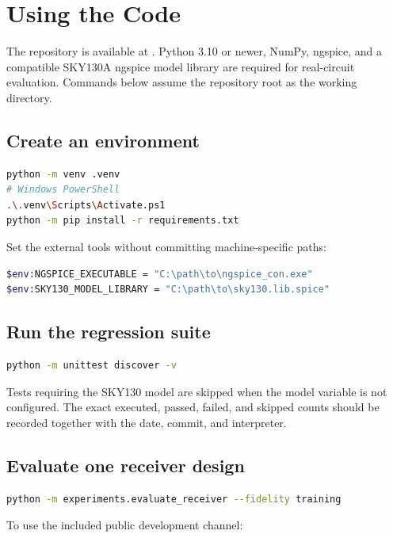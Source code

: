 \chapter{Using the Code}

The repository is available at \href{\projecturl}{\projecturl}. Python 3.10 or
newer, NumPy, ngspice, and a compatible SKY130A ngspice model library are
required for real-circuit evaluation. Commands below assume the repository root
as the working directory.

\section{Create an environment}

\begin{lstlisting}[language=bash]
python -m venv .venv
# Windows PowerShell
.\.venv\Scripts\Activate.ps1
python -m pip install -r requirements.txt
\end{lstlisting}

Set the external tools without committing machine-specific paths:

\begin{lstlisting}[language=bash]
$env:NGSPICE_EXECUTABLE = "C:\path\to\ngspice_con.exe"
$env:SKY130_MODEL_LIBRARY = "C:\path\to\sky130.lib.spice"
\end{lstlisting}

\section{Run the regression suite}

\begin{lstlisting}[language=bash]
python -m unittest discover -v
\end{lstlisting}

Tests requiring the SKY130 model are skipped when the model variable is not
configured. The exact executed, passed, failed, and skipped counts should be
recorded together with the date, commit, and interpreter.

\section{Evaluate one receiver design}

\begin{lstlisting}[language=bash]
python -m experiments.evaluate_receiver --fidelity training
\end{lstlisting}

To use the included public development channel:

